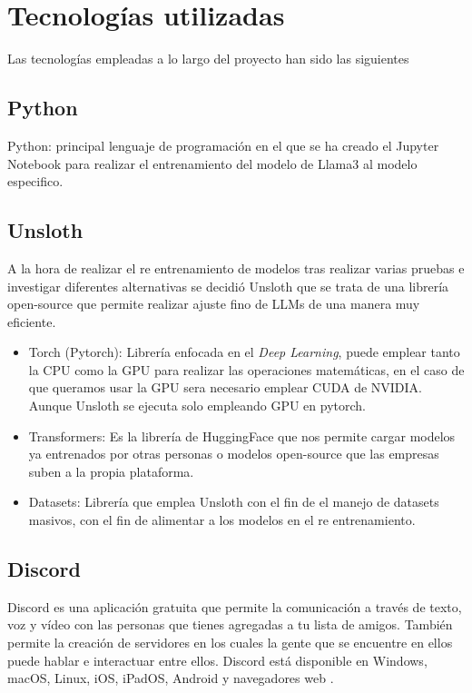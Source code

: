 \chapter{Tecnologías utilizadas}

Las tecnologías empleadas a lo largo del proyecto han sido las siguientes

\section{Python}
Python: principal lenguaje de programación en el que se ha creado el Jupyter Notebook para realizar el entrenamiento del modelo de Llama3 al modelo especifico.

\section{Unsloth}
A la hora de realizar el re entrenamiento de modelos tras realizar varias pruebas e investigar diferentes alternativas se decidió Unsloth \cite{Unsloth} que se trata de una librería open-source que permite realizar ajuste fino de LLMs de una manera muy eficiente.

\begin{itemize}
    \item Torch (Pytorch): Librería enfocada en el \textit{Deep Learning}, puede emplear tanto la CPU como la GPU para realizar las operaciones matemáticas, en el caso de que queramos usar la GPU sera necesario emplear CUDA de NVIDIA. Aunque Unsloth se ejecuta solo empleando GPU en pytorch.\cite{pytorch}

    \item Transformers: Es la librería de HuggingFace que nos permite cargar modelos ya entrenados por otras personas o modelos open-source que las empresas suben a la propia plataforma.\cite{transformers}

    \item Datasets: Librería que emplea Unsloth con el fin de el manejo de datasets masivos, con el fin de alimentar a los modelos en el re entrenamiento.\cite{datasets}
\end{itemize}

\section{Discord}

Discord es una aplicación gratuita que permite la comunicación a través de texto, voz y vídeo con las personas que tienes agregadas a tu lista de amigos. También permite la creación de servidores en los cuales la gente que se encuentre en ellos puede hablar  e interactuar entre ellos. Discord está disponible en Windows, macOS, Linux, iOS, iPadOS, Android y navegadores web \cite{discord}.

